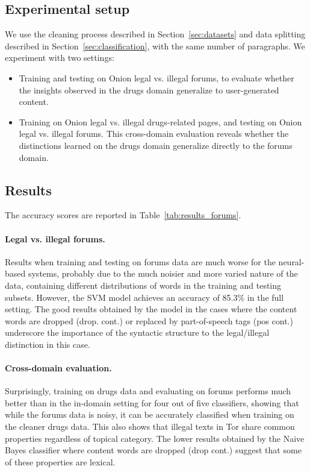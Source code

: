 \documentclass[11pt,a4paper,table]{article}
\begin{document}
\subsection{Experimental setup}
We use the cleaning process described in Section~\ref{sec:datasets} and data splitting described in Section~\ref{sec:classification}, with the same number of paragraphs.
We experiment with two settings:
\begin{itemize}
\item Training and testing on Onion legal vs. illegal forums,
to evaluate whether the insights observed in the drugs domain generalize to user-generated content.
\item Training on Onion legal vs. illegal drugs-related pages,
and testing on Onion legal vs. illegal forums.
This cross-domain evaluation reveals whether the distinctions learned on the
drugs domain generalize directly to the forums domain.
\end{itemize}  

\subsection{Results}

The accuracy scores are reported in Table~\ref{tab:results_forums}.

\paragraph{Legal vs. illegal forums.}

Results when training and testing on forums data are much worse for the neural-based systems,
probably due to the much noisier and more varied nature of the data,
containing different distributions of words in the training and testing
subsets. However, the SVM model achieves an accuracy of 85.3\% in the full setting. The good results obtained by the model in the cases where the content words are dropped (drop. cont.) or replaced by part-of-speech tags (pos cont.) underscore the importance of the syntactic structure to the legal/illegal distinction in this case. 

\paragraph{Cross-domain evaluation.}

Surprisingly, training on drugs data and evaluating on forums performs much
better than %
in the in-domain setting
for four out of five classifiers,
showing that while the forums data is noisy, it can be accurately classified
when training on the cleaner drugs data. This also shows that illegal texts in Tor share common properties regardless of topical category.
The lower results obtained by the Naive Bayes classifier where content words are dropped (drop cont.) suggest that some of
these properties are lexical.
\end{document}
